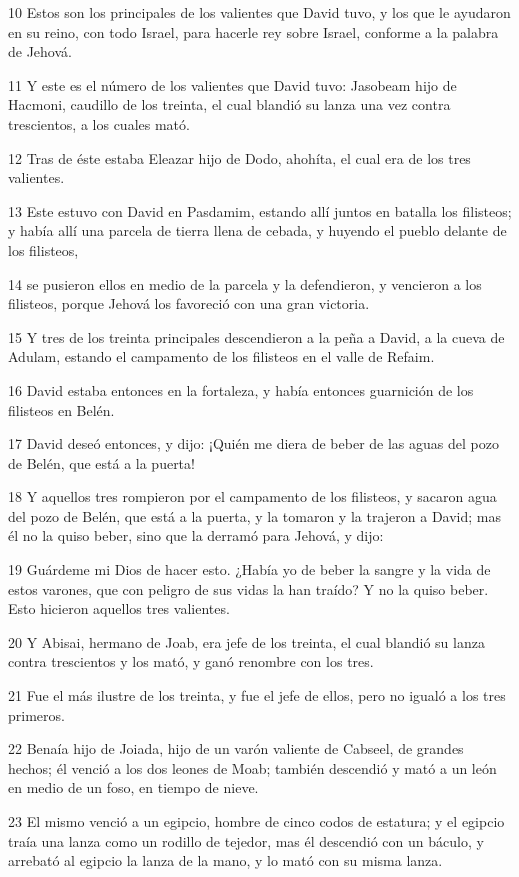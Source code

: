 \par 10 Estos son los principales de los valientes que David tuvo, y los que le ayudaron en su reino, con todo Israel, para hacerle rey sobre Israel, conforme a la palabra de Jehová.
\par 11 Y este es el número de los valientes que David tuvo: Jasobeam hijo de Hacmoni, caudillo de los treinta, el cual blandió su lanza una vez contra trescientos, a los cuales mató.
\par 12 Tras de éste estaba Eleazar hijo de Dodo, ahohíta, el cual era de los tres valientes.
\par 13 Este estuvo con David en Pasdamim, estando allí juntos en batalla los filisteos; y había allí una parcela de tierra llena de cebada, y huyendo el pueblo delante de los filisteos,
\par 14 se pusieron ellos en medio de la parcela y la defendieron, y vencieron a los filisteos, porque Jehová los favoreció con una gran victoria.
\par 15 Y tres de los treinta principales descendieron a la peña a David, a la cueva de Adulam, estando el campamento de los filisteos en el valle de Refaim.
\par 16 David estaba entonces en la fortaleza, y había entonces guarnición de los filisteos en Belén.
\par 17 David deseó entonces, y dijo: ¡Quién me diera de beber de las aguas del pozo de Belén, que está a la puerta!
\par 18 Y aquellos tres rompieron por el campamento de los filisteos, y sacaron agua del pozo de Belén, que está a la puerta, y la tomaron y la trajeron a David; mas él no la quiso beber, sino que la derramó para Jehová, y dijo:
\par 19 Guárdeme mi Dios de hacer esto. ¿Había yo de beber la sangre y la vida de estos varones, que con peligro de sus vidas la han traído? Y no la quiso beber. Esto hicieron aquellos tres valientes.
\par 20 Y Abisai, hermano de Joab, era jefe de los treinta, el cual blandió su lanza contra trescientos y los mató, y ganó renombre con los tres.
\par 21 Fue el más ilustre de los treinta, y fue el jefe de ellos, pero no igualó a los tres primeros.
\par 22 Benaía hijo de Joiada, hijo de un varón valiente de Cabseel, de grandes hechos; él venció a los dos leones de Moab; también descendió y mató a un león en medio de un foso, en tiempo de nieve.
\par 23 El mismo venció a un egipcio, hombre de cinco codos   de estatura; y el egipcio traía una lanza como un rodillo de tejedor, mas él descendió con un báculo, y arrebató al egipcio la lanza de la mano, y lo mató con su misma lanza.
